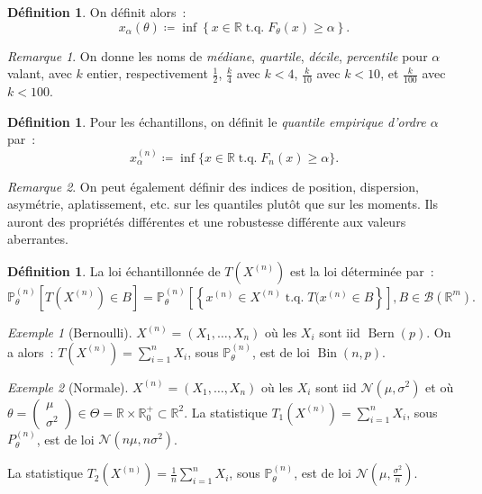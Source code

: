 \documentclass{report}
\DeclareMathOperator{\tq}{\text{ t.q. }}
\DeclareMathOperator{\Bern}{Bern}  %
\DeclareMathOperator{\Bin}{Bin}  %
\renewcommand{\P}{\mathbb P}
\newcommand{\Nms}{\mathcal N(\mu, \sigma^2)}
\newcommand{\R}{\mathbb R}
\newcommand{\Brl}{\mathcal B}  %
\theoremstyle{definition}
\newtheorem{déf}[thm]{Définition}
\theoremstyle{remark}
\newtheorem*{rmq}{Remarque}
\newtheorem{ex}{Exemple}[chapter]
\begin{document}
		\begin{déf} On définit alors~:
		\[x_\alpha(\theta) \coloneqq \inf\left\{x \in \R \tq F_\theta(x) \geq \alpha\right\}.\]
		\end{déf}

		\begin{rmq} On donne les noms de \textit{médiane}, \textit{quartile}, \textit{décile}, \textit{percentile} pour $\alpha$ valant, avec $k$ entier,
		respectivement $\frac 12$, $\frac k4$ avec $k < 4$, $\frac k{10}$ avec $k < 10$, et $\frac k{100}$ avec $k < 100$.
		\end{rmq}

		\begin{déf} Pour les échantillons, on définit le \textit{quantile empirique d'ordre $\alpha$} par~:
		\[x_\alpha^{(n)} \coloneqq \inf\{x \in \R \tq F_n(x) \geq \alpha\}.\]
		\end{déf}

		\begin{rmq} On peut également définir des indices de position, dispersion, asymétrie, aplatissement, etc. sur les quantiles plutôt que sur les moments.
		Ils auront des propriétés différentes et une robustesse différente aux valeurs aberrantes.
		\end{rmq}

		\begin{déf} La loi échantillonnée de $T(X^{(n)})$ est la loi déterminée par~:
		\[\P_\theta^{(n)}\left[T(X^{(n)}) \in B\right] = \P_\theta^{(n)}\left[\left\{x^{(n)} \in X^{(n)} \tq T(x^{(n)} \in B\right\}\right], B \in \Brl(\R^m).\]
		\end{déf}

		\begin{ex}[Bernoulli] $X^{(n)} = (X_1, \ldots, X_n)$ où les $X_i$ sont iid $\Bern(p)$. On a alors~: $T(X^{(n)}) = \sum_{i=1}^nX_i$, sous
		$\P_\theta^{(n)}$, est de loi $\Bin(n, p)$.
		\end{ex}

		\begin{ex}[Normale] $X^{(n)} = (X_1, \ldots, X_n)$ où les $X_i$ sont iid $\Nms$ et où
		$\theta = \begin{pmatrix}\mu \\ \sigma^2\end{pmatrix} \in \Theta = \R \times \R^+_0 \subset \R^2$.
		La statistique $T_1(X^{(n)}) = \sum_{i=1}^nX_i$, sous $P_\theta^{(n)}$, est de loi $\mathcal N(n\mu, n\sigma^2)$.

		La statistique $T_2(X^{(n)}) = \frac 1n\sum_{i=1}^nX_i$, sous $\P_\theta^{(n)}$, est de loi $\mathcal N(\mu, \frac {\sigma^2}n)$.
		\end{ex}
\end{document}
